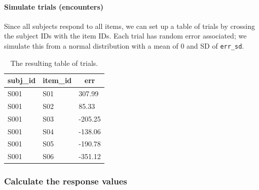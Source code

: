 \documentclass[man,floatsintext]{apa6}
\newenvironment{Shaded}{\begin{snugshade}}{\end{snugshade}}
\newcommand{\KeywordTok}[1]{\textcolor[rgb]{0.13,0.29,0.53}{\textbf{#1}}}
\newcommand{\DataTypeTok}[1]{\textcolor[rgb]{0.13,0.29,0.53}{#1}}
\newcommand{\DecValTok}[1]{\textcolor[rgb]{0.00,0.00,0.81}{#1}}
\newcommand{\StringTok}[1]{\textcolor[rgb]{0.31,0.60,0.02}{#1}}
\newcommand{\CommentTok}[1]{\textcolor[rgb]{0.56,0.35,0.01}{\textit{#1}}}
\newcommand{\OperatorTok}[1]{\textcolor[rgb]{0.81,0.36,0.00}{\textbf{#1}}}
\newcommand{\NormalTok}[1]{#1}
\let\oldparagraph\paragraph
\renewcommand{\paragraph}[1]{\oldparagraph{#1}\mbox{}}
\begin{document}
\paragraph{Simulate trials
(encounters)}\label{simulate-trials-encounters}

Since all subjects respond to all items, we can set up a table of trials
by crossing the subject IDs with the item IDs. Each trial has random
error associated; we simulate this from a normal distribution with a
mean of 0 and SD of \texttt{err\_sd}.

\begin{Shaded}
\end{Shaded}

\begin{table}[tbp]
\begin{center}
\begin{threeparttable}
\caption{\label{tab:trials-table}The resulting table of trials.}
\begin{tabular}{lll}
\toprule
subj\_id & \multicolumn{1}{c}{item\_id} & \multicolumn{1}{c}{err}\\
\midrule
S001 & S01 & 307.99\\
S001 & S02 & 85.33\\
S001 & S03 & -205.25\\
S001 & S04 & -138.06\\
S001 & S05 & -190.78\\
S001 & S06 & -351.12\\
\bottomrule
\end{tabular}
\end{threeparttable}
\end{center}
\end{table}

\subsubsection{Calculate the response
values}\label{calculate-the-response-values}
\end{document}

